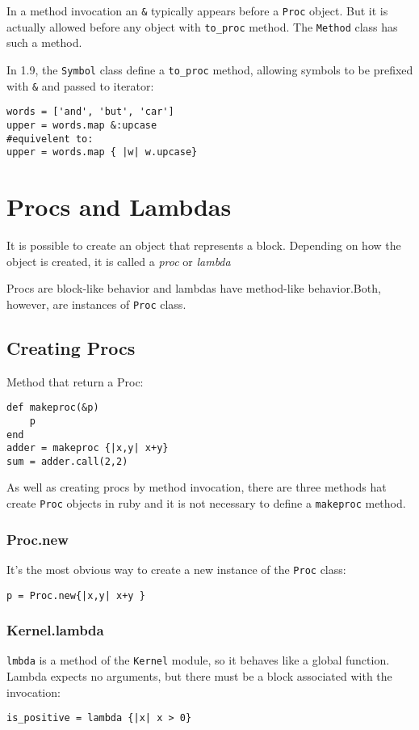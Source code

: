 \documentclass[11pt, a4paper]{book}
\begin{document}
In a method invocation an \verb|&| typically appears before a \verb|Proc|
object. But it is actually allowed before any object with \verb|to_proc| method.
The \verb|Method| class has such a method.

In 1.9, the \verb|Symbol| class define a \verb|to_proc| method, allowing symbols
to be prefixed with \verb|&| and passed to iterator:
\begin{verbatim}
words = ['and', 'but', 'car']
upper = words.map &:upcase
#equivelent to:
upper = words.map { |w| w.upcase}
\end{verbatim}

\section{Procs and Lambdas}
It is possible to create an object that represents a block. Depending on how the
object is created, it is called a \emph{proc} or \emph{lambda}

Procs are block-like behavior and lambdas have method-like behavior.Both,
however, are instances of \verb|Proc| class.

\subsection{Creating Procs}
Method that return a Proc:
\begin{verbatim}
def makeproc(&p)
    p
end
adder = makeproc {|x,y| x+y}
sum = adder.call(2,2)
\end{verbatim}

As well as creating procs by method invocation, there are three methods hat
create \verb|Proc| objects in ruby and it is not necessary to define a
\verb|makeproc| method.

\subsubsection{Proc.new}
It's the most obvious way to create a new instance of the \verb|Proc| class:
\begin{verbatim}
p = Proc.new{|x,y| x+y }
\end{verbatim}

\subsubsection{Kernel.lambda}
\verb|lmbda| is a method of the \verb|Kernel| module, so it behaves like a
global function. Lambda expects no arguments, but there must be a block
associated with the invocation:
\begin{verbatim}
is_positive = lambda {|x| x > 0}
\end{verbatim}
\end{document}
